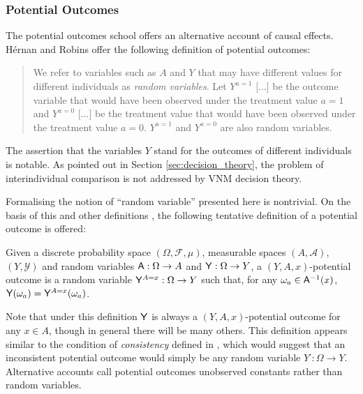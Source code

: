 \subsubsection{Potential Outcomes}

The potential outcomes school offers an alternative account of causal effects. H\'ernan and Robins offer the following definition of potential outcomes\cite{hernan_causal_2018}:

\begin{quote}
    We refer to variables such as $A$ and $Y$ that may have different values for different individuals as \emph{random variables}. Let $Y^{a=1}$ [...] be the outcome variable that would have been observed under the treatment value $a=1$ and $Y^{a=0}$ [...] be the treatment value that would have been observed under the treatment value $a=0$. $Y^{a=1}$ and $Y^{a=0}$ are also random variables.
\end{quote}

The assertion that the variables $Y$ stand for the outcomes of different individuals is notable. As pointed out in Section \ref{sec:decision_theory}, the problem of interindividual comparison is not addressed by VNM decision theory.

Formalising the notion of ``random variable'' presented here is nontrivial. On the basis of this and other definitions \cite{angrist_mastering_2014,rubin_causal_2005}, the following tentative definition of a potential outcome is offered:

\begin{definition}
Given a discrete probability space $(\Omega, \mathcal{F},\mu)$, measurable spaces $(A,\mathcal{A})$, $(Y,\mathcal{Y})$ and random variables $\mathsf{A}:\Omega\to A$ and $\mathsf{Y}:\Omega\to Y$, a $(Y,A,x)$-potential outcome is a random variable $\mathsf{Y}^{A=x}:\Omega\to Y$ such that, for any $\omega_a\in \mathsf{A}^{-1}(x)$, $\mathsf{Y}(\omega_a)=\mathsf{Y}^{A=x}(\omega_a)$.
\end{definition}

Note that under this definition $\mathsf{Y}$ is always a $(Y,A,x)$-potential outcome for any $x\in A$, though in general there will be many others. This definition appears similar to the condition of \emph{consistency} defined in \cite{hernan_does_2008}, which would suggest that an inconsistent potential outcome would simply be any random variable $Y^\cdot:\Omega \to Y$. Alternative accounts call potential outcomes unobserved constants rather than random variables\cite{angrist_identification_1996}.

